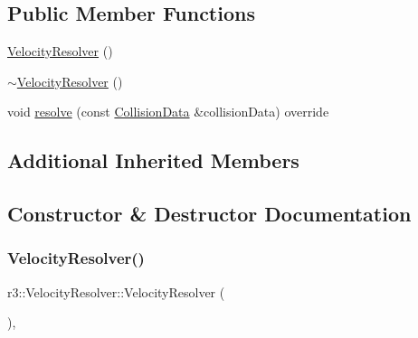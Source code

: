 \subsection*{Public Member Functions}
\begin{DoxyCompactItemize}
\item 
\mbox{\hyperlink{classr3_1_1_velocity_resolver_a827566c5d9dca936b4609dc74c587a6f}{Velocity\+Resolver}} ()
\item 
\mbox{\hyperlink{classr3_1_1_velocity_resolver_a508677a0bf2d5258ffc1550677517074}{$\sim$\+Velocity\+Resolver}} ()
\item 
void \mbox{\hyperlink{classr3_1_1_velocity_resolver_ad3fa33c02dfa07c760ca9bc5c89f49c3}{resolve}} (const \mbox{\hyperlink{classr3_1_1_collision_data}{Collision\+Data}} \&collision\+Data) override
\end{DoxyCompactItemize}
\subsection*{Additional Inherited Members}


\subsection{Constructor \& Destructor Documentation}
\mbox{\label{classr3_1_1_velocity_resolver_a827566c5d9dca936b4609dc74c587a6f}} 
\subsubsection{\texorpdfstring{Velocity\+Resolver()}{VelocityResolver()}}
{\footnotesize\ttfamily r3\+::\+Velocity\+Resolver\+::\+Velocity\+Resolver (\begin{DoxyParamCaption}{ }\end{DoxyParamCaption})\hspace{0.3cm}{\ttfamily [explicit]}, {\ttfamily [default]}}

\mbox{\label{classr3_1_1_velocity_resolver_a508677a0bf2d5258ffc1550677517074}} 

